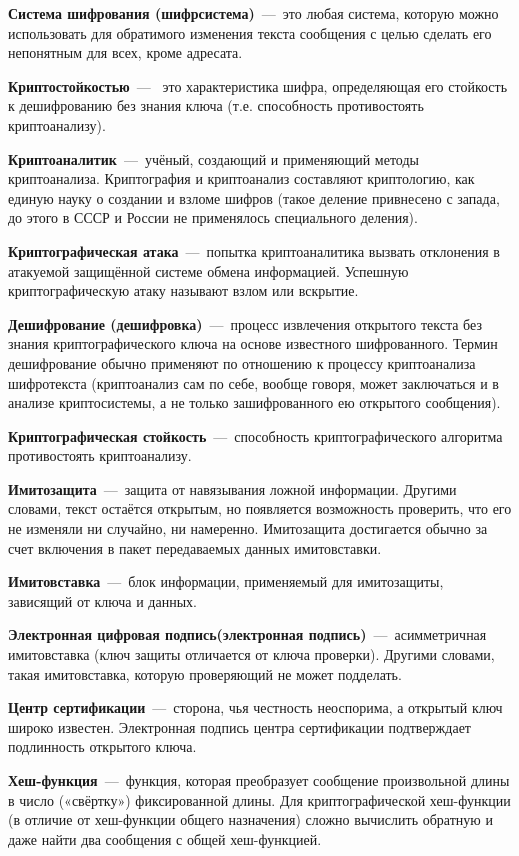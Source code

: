 \textbf{Система шифрования (шифрсистема)}~---~это любая система, которую
можно использовать для обратимого изменения текста сообщения с целью сделать
его непонятным для всех, кроме адресата.

\textbf{Криптостойкостью}~---~ это характеристика шифра, определяющая его
стойкость к дешифрованию без знания ключа (т.е. способность противостоять
криптоанализу).

\textbf{Криптоаналитик}~---~учёный, создающий и применяющий методы
криптоанализа. Криптография и криптоанализ составляют криптологию, как единую
науку о создании и взломе шифров (такое деление привнесено с запада, до этого
в СССР и России не применялось специального деления).

\textbf{Криптографическая атака}~---~попытка криптоаналитика вызвать
отклонения в атакуемой защищённой системе обмена информацией. Успешную
криптографическую атаку называют взлом или вскрытие.

\textbf{Дешифрование (дешифровка)}~---~процесс извлечения открытого текста
без знания криптографического ключа на основе известного шифрованного. Термин
дешифрование обычно применяют по отношению к процессу криптоанализа
шифротекста (криптоанализ сам по себе, вообще говоря, может заключаться и в
анализе криптосистемы, а не только зашифрованного ею открытого сообщения).

\textbf{Криптографическая стойкость}~---~способность криптографического
алгоритма противостоять криптоанализу.

\textbf{Имитозащита}~---~защита от навязывания ложной информации. Другими
словами, текст остаётся открытым, но появляется возможность проверить, что
его не изменяли ни случайно, ни намеренно. Имитозащита достигается обычно за
счет включения в пакет передаваемых данных имитовставки.

\textbf{Имитовставка}~---~блок информации, применяемый для имитозащиты,
зависящий от ключа и данных.

\textbf{Электронная цифровая подпись(электронная подпись)}~---~асимметричная
имитовставка (ключ защиты отличается от ключа проверки). Другими словами,
такая имитовставка, которую проверяющий не может подделать.

\textbf{Центр сертификации}~---~сторона, чья честность неоспорима, а открытый
ключ широко известен. Электронная подпись центра сертификации подтверждает
подлинность открытого ключа.

\textbf{Хеш-функция}~---~функция, которая преобразует сообщение произвольной
длины в число («свёртку») фиксированной длины. Для криптографической
хеш-функции (в отличие от хеш-функции общего назначения) сложно вычислить
обратную и даже найти два сообщения с общей хеш-функцией.
